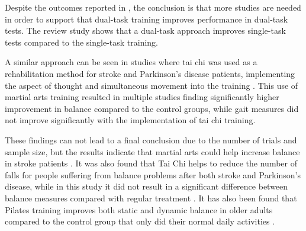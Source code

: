 Despite the outcomes reported in \cite{He2018}, the conclusion is that more studies are needed in order to support that dual-task training improves performance in dual-task tests. The review study shows that a dual-task approach improves single-task tests compared to the single-task training. \cite{He2018}

A similar approach can be seen in studies where tai chi was used as a rehabilitation method for stroke and Parkinson's disease patients, implementing the aspect of thought and simultaneous movement into the training \cite{Ding2012,Winser2018}. This use of martial arts training resulted in multiple studies finding significantly higher improvement in balance compared to the control groups, while gait measures did not improve significantly with the implementation of tai chi training. \cite{Ding2012}

These findings can not lead to a final conclusion due to the number of trials and sample size, but the results indicate that martial arts could help increase balance in stroke patients \cite{Ding2012}. It was also found that Tai Chi helps to reduce the number of falls for people suffering from balance problems after both stroke and Parkinson's disease, while in this study it did not result in a significant difference between balance measures compared with regular treatment \cite{Winser2018}. It has also been found that Pilates training improves both static and dynamic balance in older adults compared to the control group that only did their normal daily activities \cite{Moreno2017}.



